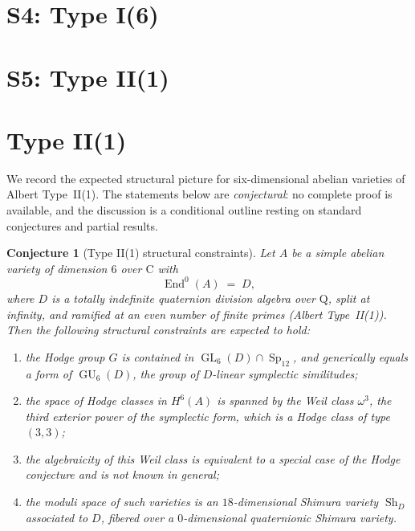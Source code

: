 \documentclass{article}
\DeclareMathOperator{\Sh}{Sh}
\DeclareMathOperator{\Sp}{Sp}
\DeclareMathOperator{\GL}{GL}
\DeclareMathOperator{\GU}{GU}
\DeclareMathOperator{\End}{End}
\newcommand{\mathbb}[1]{\mathrm{#1}}
\newtheorem{conjecture}{Conjecture}
\begin{document}
\section{S4: Type I(6)}

\section{S5: Type II(1)}
\section{Type II(1)}\label{sec:type-II-1}

We record the expected structural picture for six-dimensional abelian varieties of Albert Type~II(1). The statements below are \emph{conjectural}: no complete proof is available, and the discussion is a conditional outline resting on standard conjectures and partial results.

\begin{conjecture}[Type II(1) structural constraints]\label{conj:type-II-1}
Let $A$ be a simple abelian variety of dimension $6$ over $\mathbb{C}$ with
\[
\End^0(A) \;=\; D,
\]
where $D$ is a totally indefinite quaternion division algebra over $\mathbb{Q}$, split at infinity, and ramified at an even number of finite primes (Albert Type~II(1)). Then the following structural constraints are expected to hold:
\begin{enumerate}
  \item[(i)] the Hodge group $G$ is contained in $\GL_6(D)\cap \Sp_{12}$, and generically equals a form of $\GU_6(D)$, the group of $D$-linear symplectic similitudes;
  \item[(ii)] the space of Hodge classes in $H^6(A)$ is spanned by the Weil class $\omega^3$, the third exterior power of the symplectic form, which is a Hodge class of type $(3,3)$;
  \item[(iii)] the algebraicity of this Weil class is equivalent to a special case of the Hodge conjecture and is not known in general;
  \item[(iv)] the moduli space of such varieties is an $18$-dimensional Shimura variety $\Sh_D$ associated to $D$, fibered over a $0$-dimensional quaternionic Shimura variety.
\end{enumerate}
\end{conjecture}
\end{document}
